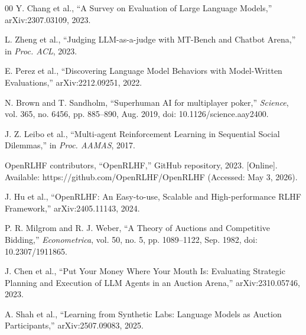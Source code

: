 \documentclass[conference]{IEEEtran}
\begin{document}
\begin{thebibliography}{00}
 Y. Chang et al., “A Survey on Evaluation of Large Language Models,” arXiv:2307.03109, 2023.

 L. Zheng et al., “Judging LLM-as-a-judge with MT-Bench and Chatbot Arena,” in \textit{Proc. ACL}, 2023.

 E. Perez et al., “Discovering Language Model Behaviors with Model-Written Evaluations,” arXiv:2212.09251, 2022.

N. Brown and T. Sandholm,
“Superhuman AI for multiplayer poker,”
\textit{Science}, vol. 365, no. 6456, pp. 885--890, Aug. 2019,
doi: 10.1126/science.aay2400.

 J. Z. Leibo et al., “Multi-agent Reinforcement Learning in Sequential Social Dilemmas,” in \textit{Proc. AAMAS}, 2017.

OpenRLHF contributors, “OpenRLHF,” GitHub repository, 2023. [Online]. Available: https://github.com/OpenRLHF/OpenRLHF (Accessed: May 3, 2026).

J. Hu et al., “OpenRLHF: An Easy-to-use, Scalable and High-performance RLHF Framework,” arXiv:2405.11143, 2024.

P. R. Milgrom and R. J. Weber,
“A Theory of Auctions and Competitive Bidding,”
\textit{Econometrica},
vol. 50, no. 5,
pp. 1089--1122,
Sep. 1982,
doi: 10.2307/1911865.

J. Chen et al.,
“Put Your Money Where Your Mouth Is:
Evaluating Strategic Planning and Execution of LLM Agents in an Auction Arena,”
arXiv:2310.05746, 2023.

A. Shah et al.,
“Learning from Synthetic Labs:
Language Models as Auction Participants,”
arXiv:2507.09083, 2025.

\end{thebibliography}
\end{document}
